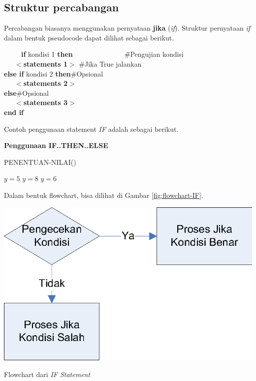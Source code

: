 \subsection{Struktur percabangan}
Percabangan biasanya menggunakan pernyataan \textbf{jika} (\textit{if}). Struktur pernyataan \textit{if} dalam bentuk pseudocode dapat dilihat sebagai berikut.

\begin{tabbing}
~~~~~\=\textbf{if} kondisi 1 \textbf{then}~~~~~~~~~~~~~~~\=\#Pengujian kondisi\\
\>~~~$<$\textbf{statements 1}$>$ \> \#Jika True jalankan\\
\>\textbf{else if } kondisi 2 \textbf{then}\>\#Opsional\\
\>~~~$<$\textbf{statements 2}$>$\>\\
\>\textbf{else}\>\#Opsional\\
\>~~~$<$\textbf{statements 3}$>$\>\\
\>\textbf{end if}
\end{tabbing}

\FloatBarrier
Contoh penggunaan statement \textit{IF} adalah sebagai berikut.

\begin{contoh}
	\textbf{Penggunaan IF..THEN..ELSE}
	\begin{algorithm}[H]
		\caption{PENENTUAN-NILAI()}
		\begin{algorithmic}[1]
			\STATE $y = 5$ 
			\STATE $y = 8$ 
		\ELSE
			\STATE $y = 6$ 
		\ENDIF
		\end{algorithmic}
	\end{algorithm}
\end{contoh}


Dalam bentuk flowchart, bisa dilihat di Gambar \ref{fig:flowchart-IF}.

\begin{marginfigure}%
\includegraphics[scale=0.6]{fig/flowchart-IF.eps}%
\caption{Flowchart dari \textit{IF Statement}}%
\label{fig:flowchart-IF}%
\end{marginfigure}

